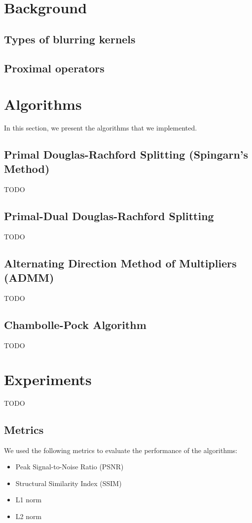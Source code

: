 \documentclass{article}
\begin{document}
\section{Background}

\subsection{Types of blurring kernels}



\subsection{Proximal operators}



\section{Algorithms}
In this section, we present the algorithms that we implemented.

\subsection{Primal Douglas-Rachford Splitting (Spingarn's Method)}
TODO

\subsection{Primal-Dual Douglas-Rachford Splitting}
TODO

\subsection{Alternating Direction Method of Multipliers (ADMM)}
TODO

\subsection{Chambolle-Pock Algorithm}
TODO

\section{Experiments}
TODO
\subsection{Metrics}
We used the following metrics to evaluate the performance of the algorithms:
\begin{itemize}
  \item Peak Signal-to-Noise Ratio (PSNR)\cite{korhonen2012peak}
  \item Structural Similarity Index (SSIM)\cite{wang2002universal}
  \item L1 norm
  \item L2 norm
\end{itemize}
\end{document}
